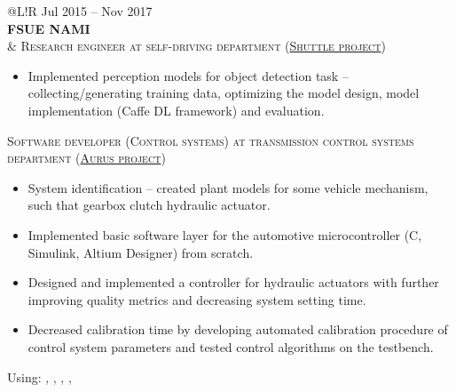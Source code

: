 \begin{tabular}{@{}L!{\VRule}R}
    Jul 2015 -- Nov 2017                                                                      \\ {\bf FSUE NAMI} \\  &
    {\textsc{Research engineer at self-driving department (\href{https://www.engadget.com/2016/08/28/yandex-teams-on-self-driving-shuttle-bus/}{Shuttle project})}}
    \begin{itemize}
        \item Implemented perception models for object detection task -- collecting/generating training data, optimizing the model design, model implementation (Caffe DL framework) and evaluation.
    \end{itemize}
    \textsc{Software developer (Control systems) at transmission control systems department (\href{https://en.wikipedia.org/wiki/Aurus_Senat}{Aurus project})}
    \begin{itemize}
        \item System identification -- created plant models for some vehicle mechanism, such that gearbox clutch hydraulic actuator.
        \item Implemented basic software layer for the automotive microcontroller (C, Simulink, Altium Designer) from scratch.
        \item Designed and implemented a controller for hydraulic actuators with further improving quality metrics and decreasing system setting time.
        \item Decreased calibration time by developing automated calibration procedure of control system parameters and tested control algorithms on the testbench.
    \end{itemize}
    Using: , , , ,  \\
\end{tabular}                                                                                                \\
%
